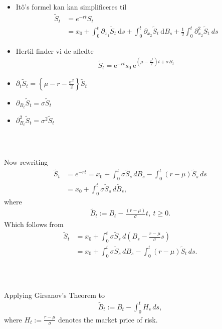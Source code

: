 \documentclass{beamer}
\numberwithin{equation}{section}
\newenvironment{frame2}{\begin{frame}\frametitle{{\normalsize \secname} \\ {\large \subsecname}}}{\end{frame}}
\begin{document}
\begin{frame2}
    \begin{itemize}
        \item Itô's formel kan kan simplificeres til
        \begin{align*}
            \tilde{S}_t &= e^{-rt}S_t\\
            &= x_0+\int_0^t\partial_{x_1}\tilde{S}_t\ \text{d}s + \int_0^t\partial_{x_2}\tilde{S}_t\ \text{d}B_s + \frac{1}{2}\int_0^t\partial_{x_2}^2 \tilde{S}_t \ d s
        \end{align*}
        \item Hertil finder vi de afledte
        \begin{align*}
            \tilde{S}_t =\mathrm{e}^{-rt}s_0 \ \mathrm{e}^{(\mu-\frac{\sigma^2}{2})t+\sigma B_t}
        \end{align*}
        \item $\partial_t \tilde{S}_t = \left\{ \mu - r -  \frac{\sigma^2}{2}\right\}\tilde{S}_t$
        \item $\partial_{B_t} \tilde{S}_t = \sigma \tilde{S}_t$
        \item $\partial^2_{B_t} \tilde{S}_t = \sigma^2 \tilde{S}_t$
    \end{itemize}
\end{frame2}

\begin{frame2}
    Now rewriting
    \begin{align}
        \tilde{S}_t &= e^{-rt} = x_0 + \int_0^t \sigma \tilde{S}_s\, dB_s - \int_0^t (r - \mu)\tilde{S}_s\, ds \\
        &= x_0 + \int_0^t \sigma \tilde{S}_s \, d \tilde{B}_s,
    \end{align}
    where
    \begin{align}
        \tilde{B}_t := B_t - \frac{(r - \mu)}{\sigma}t, \ t \geq 0.
    \end{align}
    Which follows from
    \begin{align}
        \tilde{S}_t &= x_0 + \int_0^t \sigma \tilde{S}_s \, d\left(B_s - \frac{r - \mu}{\sigma}s\right) \\
        &= x_0 + \int_0^t \sigma \tilde{S}_s \, dB_s - \int_0^t (r - \mu)\tilde{S}_t \, ds.
    \end{align}
\end{frame2}

\begin{frame2}
    Applying Girsanov's Theorem to
    \begin{align}
        \tilde{B}_t := B_t - \int_0^t H_s \, ds,
    \end{align}
    where $H_t := \frac{r - \mu}{\sigma}$ denotes the market price of risk.
\end{frame2}
\end{document}
